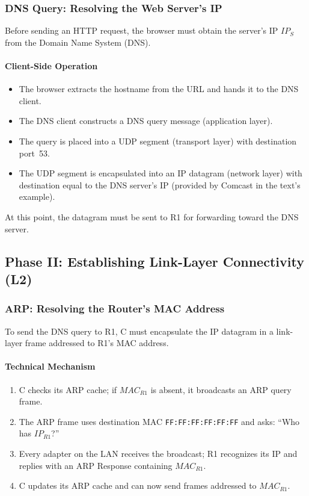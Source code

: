 \documentclass[12pt]{article}
\begin{document}
\subsubsection{DNS Query: Resolving the Web Server's IP}

Before sending an HTTP request, the browser must obtain the server's IP $IP_S$ from the Domain Name System (DNS).

\paragraph{Client-Side Operation}
\begin{itemize}
    \item The browser extracts the hostname from the URL and hands it to the DNS client.
    \item The DNS client constructs a DNS query message (application layer).
    \item The query is placed into a UDP segment (transport layer) with destination port~53.
    \item The UDP segment is encapsulated into an IP datagram (network layer) with destination equal to the DNS server's IP (provided by Comcast in the text's example).
\end{itemize}

At this point, the datagram must be sent to R1 for forwarding toward the DNS server.

\subsection{Phase II: Establishing Link-Layer Connectivity (L2)}

\subsubsection{ARP: Resolving the Router’s MAC Address}

To send the DNS query to R1, C must encapsulate the IP datagram in a link-layer frame addressed to R1's MAC address.

\paragraph{Technical Mechanism}
\begin{enumerate}
    \item C checks its ARP cache; if $MAC_{R1}$ is absent, it broadcasts an ARP query frame.
    \item The ARP frame uses destination MAC \texttt{FF:FF:FF:FF:FF:FF} and asks: ``Who has $IP_{R1}$?''
    \item Every adapter on the LAN receives the broadcast; R1 recognizes its IP and replies with an ARP Response containing $MAC_{R1}$.
    \item C updates its ARP cache and can now send frames addressed to $MAC_{R1}$.
\end{enumerate}
\end{document}
